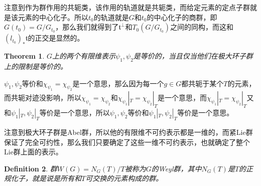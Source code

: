 \documentclass[8pt]{book}
\theoremstyle{plain}
\newtheorem{defi}{Definition}
\newtheorem{theo}[defi]{Theorem}
\begin{document}
注意到作为群作用的共轭类，该作用的轨道就是共轭类，而给定元素的定点子群就是该元素的中心化子。所以$t_0$的轨道就是$G$和$t_0$的中心化子的商群，即$G(t_0)=G/G_{t_0}$，那么我们就得到了$\mathfrak{t}^\bot$和$T_0(G/G_{t_0})$之间的同构，而这和$(l_{t_0})_*\mathfrak{t}$的正交是显然的。
\begin{theo}
$G$上的两个有限维表示$\psi_1,\psi_2$是等价的，当且仅当他们在极大环子群上的限制是等价的。
\end{theo}
$\psi_1,\psi_2$等价和$\chi_{\psi_1}=\chi_{\psi_2}$是一个意思，那么因为每一个$g\in G$都共轭于某个$T$的元素，而共轭对迹没影响，所以$\chi_{\psi_1}=\chi_{\psi_2}$和$\chi_{\psi_1}|_T=\chi_{\psi_2}|_T$是一个意思，而$\chi_{\psi_1}|_T=\chi_{\psi_2}|_T$又和$\psi_1|_T,\psi_2|_T$等价是一个意思，所以$\psi_1,\psi_2$等价和$\psi_1|_T,\psi_2|_T$等价是一个意思。

注意到极大环子群是Abel群，所以他的有限维不可约表示都是一维的，而紧Lie群保证了完全可约性，那么我们只要确定了这些一维不可约表示，也就确定了整个Lie群上面的表示。
\begin{defi}
群$W(G)=N_G(T)/T$被称为$G$的Weyl群，其中$N_G(T)$是$T$的正规化子，就是说是所有和$T$可交换的元素构成的群。
\end{defi}
\end{document}
